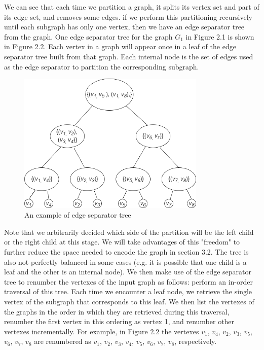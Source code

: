 \documentclass[12pt,glossary]{dalthesis}
\begin{document}
\bigskip

We can see that each time we partition a graph, it splits its vertex set and part of its edge set, and removes some edges. if we perform this partitioning recursively until each subgraph has only one vertex, then we have an edge separator tree from the graph. One edge separator tree for the graph $G_{1}$ in Figure 2.1 is shown in Figure 2.2. Each vertex in a graph will appear once in a leaf of the edge separator tree built from that graph. Each internal node is the set of edges used as the edge separator to partition the corresponding subgraph.

\begin{figure}[ht]
\centering
\includegraphics[width=0.8\textwidth]{separatorTree}
\caption{An example of edge separator tree}
\end{figure}

\bigskip
\bigskip
Note that we arbitrarily decided which side of the partition will be the left child or the right child at this stage. We will take advantages of this "freedom" to further reduce the space needed to encode the graph in section 3.2. The tree is also not perfectly balanced in some cases (e.g. it is possible that one child is a leaf and the other is an internal node). We then make use of the edge separator tree to renumber the vertexes of the input graph as follows: perform an in-order traversal of this tree. Each time we encounter a leaf node, we retrieve the single vertex of the subgraph that corresponds to this leaf. We then list the vertexes of the graphs in the order in which they are retrieved during this traversal, renumber the first vertex in this ordering as vertex 1, and renumber other vertexes incrementally. For example, in Figure 2.2 the vertexes $v_{1}$, $v_{4}$, $v_{2}$, $v_{3}$, $v_{5}$, $v_{6}$, $v_{7}$, $v_{8}$ are renumbered as $v_{1}$, $v_{2}$, $v_{3}$, $v_{4}$, $v_{5}$, $v_{6}$, $v_{7}$, $v_{8}$, respectively.
\end{document}
